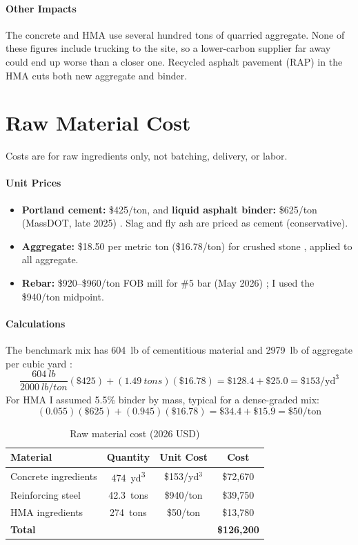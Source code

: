 \documentclass[11pt]{article}
\begin{document}
\paragraph{Other Impacts}
The concrete and HMA use several hundred tons of quarried aggregate. None of these figures include trucking to the site, so a lower-carbon supplier far away could end up worse than a closer one. Recycled asphalt pavement (RAP) in the HMA cuts both new aggregate and binder.

\section{Raw Material Cost}
Costs are for raw ingredients only, not batching, delivery, or labor.

\paragraph{Unit Prices}
\begin{itemize}
    \item \textbf{Portland cement:} \$425/ton, and \textbf{liquid asphalt binder:} \$625/ton (MassDOT, late 2025) \cite{massdot}. Slag and fly ash are priced as cement (conservative).
    \item \textbf{Aggregate:} \$18.50 per metric ton (\$16.78/ton) for crushed stone \cite{usgs}, applied to all aggregate.
    \item \textbf{Rebar:} \$920--\$960/ton FOB mill for \#5 bar (May 2026) \cite{steelorbis}; I used the \$940/ton midpoint.
\end{itemize}

\paragraph{Calculations}
The benchmark mix has \SI{604}{lb} of cementitious material and \SI{2979}{lb} of aggregate per cubic yard \cite{nrmca}:
\[
\frac{\SI{604}{lb}}{\SI{2000}{lb/ton}}(\$425) + (\SI{1.49}{tons})(\$16.78) = \$128.4 + \$25.0 = \$153/\text{yd}^3
\]
For HMA I assumed 5.5\% binder by mass, typical for a dense-graded mix:
\[
(0.055)(\$625) + (0.945)(\$16.78) = \$34.4 + \$15.9 = \$50/\text{ton}
\]

\begin{table}[H]
    \centering
    \caption{Raw material cost (2026 USD)}
    \label{tab:cost}
    \begin{tabular}{lccc}
        \toprule
        \textbf{Material} & \textbf{Quantity} & \textbf{Unit Cost} & \textbf{Cost} \\
        \midrule
        Concrete ingredients & \SI{474}{yd^3} & \$153/yd$^3$ & \$72{,}670 \\
        Reinforcing steel & \SI{42.3}{tons} & \$940/ton & \$39{,}750 \\
        HMA ingredients & \SI{274}{tons} & \$50/ton & \$13{,}780 \\
        \midrule
        \textbf{Total} & & & \textbf{\$126{,}200} \\
        \bottomrule
    \end{tabular}
\end{table}
\end{document}
